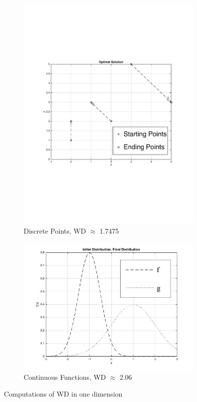 \documentclass[10pt]{article}
\begin{document}
\begin{figure}[H]
\centering
\begin{subfigure}{.5\textwidth}
  \centering
  \includegraphics[scale = .4]{1st1DWD.pdf}
  \caption{Discrete Points, WD $\approx$ 1.7475}
  \label{fig: 1Ddiscreet}
\end{subfigure}%
\begin{subfigure}{.5\textwidth}
  \centering
  \includegraphics[scale = .4]{1DWDNormal.jpg}
  \caption{Continuous Functions, WD $\approx$ 2.06}
  \label{fig: 1DContinuous}
\end{subfigure}
\caption{Computations of WD in one dimension}
\label{fig:1DWDCalculations}
\end{figure}
\end{document}
